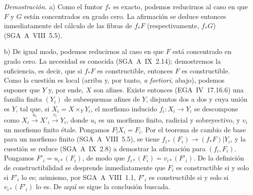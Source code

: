 \emph{Demostración.} a) Como el funtor $f_{*}$ es exacto, podemos reducirnos al caso en que $F$ y $G$ están concentrados en grado cero. La afirmación se deduce entonces inmediatamente del cálculo de las fibras de $f_{*}F$ (respectivamente, $f_{*}G$) (SGA~A~VIII~5.5).

b) De igual modo, podemos reducirnos al caso en que $F$ está concentrado en grado cero. La necesidad es conocida (SGA~A~IX~2.14); demostremos la suficiencia, es decir, que si $f_{*}F$ es constructible, entonces $F$ es constructible. Como la cuestión es local (arriba y, por tanto, \emph{a fortiori}, abajo), podemos suponer que $Y$ y, por ende, $X$ son afines. Existe entonces (EGA~IV~17.16.6) una familia finita $(Y_i)$ de subesquemas afines de $Y$, disjuntos dos a dos y cuya unión es $Y$, tal que, si $X_i = X \times_Y Y_i$, el morfismo inducido $f_i : X_i \to Y_i$ se descompone como $X_i \xrightarrow{u_i} X'_i \xrightarrow{v_i} Y_i$, donde $u_i$ es un morfismo finito, radicial y sobreyectivo, y $v_i$ un morfismo finito étale. Pongamos $F|X_i = F_i$. Por el teorema de cambio de base para un morfismo finito (SGA~A~VIII~5.5), se tiene $f_{i*}(F_i) \to (f_{*}F)|Y_i$, y la cuestión se reduce (SGA~A~IX~2.8) a demostrar la afirmación para $(f_i, F_i)$. Pongamos $F'_i = u_{i*}(F_i)$, de modo que $f_{i*}(F_i) = v_{i*}(F'_i)$. De la definición de constructibilidad se desprende inmediatamente que $F_i$ es constructible si y solo si $F'_i$ lo es; asimismo, por SGA~A~VIII~1.1, $F'_i$ es constructible si y solo si $v_{i*}(F'_i)$ lo es. De aquí se sigue la conclusión buscada.
